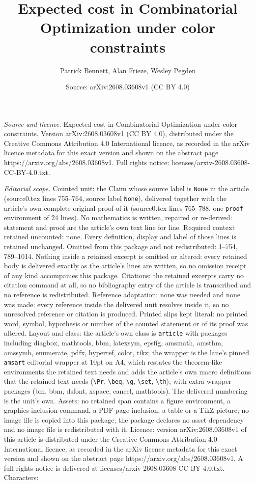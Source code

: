 \documentclass[10pt,a4paper]{amsart}
\title[Expected cost in Combinatorial Optimization under color cons]{Expected cost in Combinatorial Optimization under color constraints}
\author{Patrick Bennett, Alan Frieze, Wesley Pegden}
\date{Source: arXiv:2608.03608v1 (CC BY 4.0)}
\begin{document}
\maketitle

\noindent\emph{Source and licence.} Expected cost in Combinatorial Optimization under color constraints. Version arXiv:2608.03608v1 (CC BY 4.0), distributed under the Creative Commons Attribution 4.0 International licence, as recorded in the arXiv licence metadata for this exact version and shown on the abstract page https://arxiv.org/abs/2608.03608v1. Full rights notice: licenses/arxiv-2608.03608-CC-BY-4.0.txt.\par\smallskip

\noindent\textit{Editorial scope.} Counted unit: the Claim whose source label is \texttt{None} in the article (source0.tex lines 755--764, source label \texttt{None}), delivered together with the article's own complete original proof of it (source0.tex lines 765--788, one \texttt{proof} environment of 24 lines). No mathematics is written, repaired or re-derived: statement and proof are the article's own text line for line. Required context retained uncounted: none. Every definition, display and label of those lines is retained unchanged. Omitted from this package and not redistributed: 1--754, 789--1014. Nothing inside a retained excerpt is omitted or altered: every retained body is delivered exactly as the article's lines are written, so no omission receipt of any kind accompanies this package. Citations: the retained excerpts carry no citation command at all, so no bibliography entry of the article is transcribed and no reference is redistributed. Reference adaptation: none was needed and none was made; every reference inside the delivered unit resolves inside it, so no unresolved reference or citation is produced. Printed slips kept literal: no printed word, symbol, hypothesis or number of the counted statement or of its proof was altered. Layout and class: the article's own class is \texttt{article} with packages including diagbox, mathtools, bbm, latexsym, epsfig, amsmath, amsthm, amssymb, enumerate, pdfx, hyperref, color, tikz; the wrapper is the lane's pinned \texttt{amsart} editorial wrapper at 10pt on A4, which restates the theorem-like environments the retained text needs and adds the article's own macro definitions that the retained text needs (\texttt{\textbackslash Pr}, \texttt{\textbackslash beq}, \texttt{\textbackslash g}, \texttt{\textbackslash set}, \texttt{\textbackslash th}), with extra wrapper packages (bm, bbm, dsfont, xspace, cancel, mathtools). The delivered numbering is the unit's own. Assets: no retained span contains a figure environment, a graphics-inclusion command, a PDF-page inclusion, a table or a TikZ picture; no image file is copied into this package, the package declares no asset dependency and no image file is redistributed with it. Licence: version arXiv:2608.03608v1 of this article is distributed under the Creative Commons Attribution 4.0 International licence, as recorded in the arXiv licence metadata for this exact version and shown on the abstract page https://arxiv.org/abs/2608.03608v1. A full rights notice is delivered at licenses/arxiv-2608.03608-CC-BY-4.0.txt. Characters: 
\end{document}
